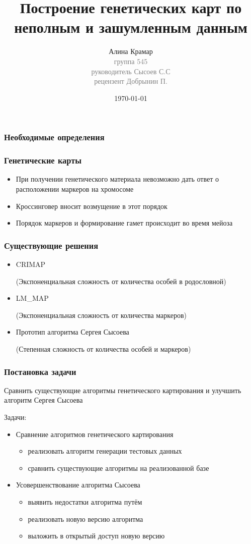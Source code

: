 \documentclass{beamer}
\title{Построение генетических карт по неполным и
зашумленным данным}
\author{Алина Крамар\\
  { \footnotesize \textcolor{gray}{группа 545\\ руководитель Сысоев
      С.С\\ рецензент Добрынин П.}}}
\institute{Санкт-Петербургский государственный университет}
\date{\today}
\begin{document}
\begin{frame}
\titlepage
\end{frame}


\begin{frame}
  \frametitle{Необходимые определения}

\end{frame}

\begin{frame}
  \frametitle{Генетические карты}
  \begin{itemize}
    \item При получении генетического материала невозможно дать ответ
      о расположении маркеров на хромосоме
    \item Кроссинговер вносит возмущение в этот порядок
    \item Порядок маркеров и формирование гамет происходит во время мейоза
  \end{itemize}
\end{frame}

\begin{frame}
  \frametitle{Существующие решения}
  \begin{itemize}
      \item CRIMAP

        (Экспоненциальная сложность от количества особей в родословной)
      \item LM\_MAP

        (Экспоненциальная сложность от количества маркеров)
      \item Прототип алгоритма Сергея Сысоева

        (Степенная сложность от количества особей и маркеров)
  \end{itemize}
\end{frame}

\begin{frame}
  \frametitle{Постановка задачи}
  Сравнить существующие алгоритмы генетического картирования и
  улучшить алгоритм Сергея Сысоева

  Задачи:
  \begin{itemize}
  \item Сравнение алгоритмов генетического картирования
    \begin{itemize}
      \item реализовать алгоритм генерации тестовых данных
      \item сравнить существующие алгоритмы на реализованной базе
    \end{itemize}
  \item Усовершенствование алгоритма Сысоева
    \begin{itemize}
      \item выявить недостатки алгоритма путём
      \item реализовать новую версию алгоритма
      \item выложить в открытый доступ новую версию
    \end{itemize}
  \end{itemize}
\end{frame}
\end{document}
